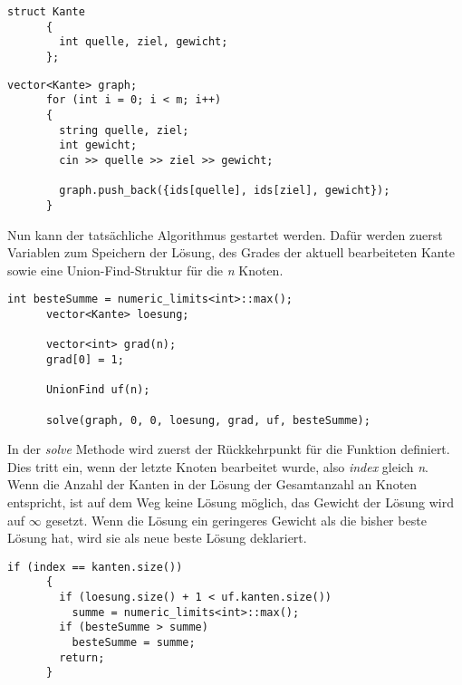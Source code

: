 \documentclass[12pt]{scrartcl}
\begin{document}
      \vspace{12pt}
      \begin{lstlisting}[style=c++]
      struct Kante
      {
        int quelle, ziel, gewicht;
      };
      \end{lstlisting}

      \vspace{12pt}
      \begin{lstlisting}[style=c++]
      vector<Kante> graph;
      for (int i = 0; i < m; i++)
      {
        string quelle, ziel;
        int gewicht;
        cin >> quelle >> ziel >> gewicht;

        graph.push_back({ids[quelle], ids[ziel], gewicht});
      }
      \end{lstlisting}

      \pagebreak

      \vspace{12pt}\noindent
      Nun kann der tats{\"a}chliche Algorithmus gestartet werden. Daf{\"u}r werden zuerst Variablen zum Speichern der L{\"o}sung, des Grades der aktuell bearbeiteten Kante sowie eine Union-Find-Struktur f{\"u}r die \textit{n} Knoten.

      \vspace{12pt}
      \begin{lstlisting}[style=c++]
      int besteSumme = numeric_limits<int>::max();
      vector<Kante> loesung;
      
      vector<int> grad(n);
      grad[0] = 1;
      
      UnionFind uf(n);
      
      solve(graph, 0, 0, loesung, grad, uf, besteSumme);
      \end{lstlisting}

      \vspace{12pt}\noindent
      In der \textit{solve} Methode wird zuerst der R{\"u}ckkehrpunkt f{\"u}r die Funktion definiert. Dies tritt ein, wenn der letzte Knoten bearbeitet wurde, also \textit{index} gleich \textit{n}. Wenn die Anzahl der Kanten in der L{\"o}sung der Gesamtanzahl an Knoten entspricht, ist auf dem Weg keine L{\"o}sung m{\"o}glich, das Gewicht der L{\"o}sung wird auf $\infty$ gesetzt. Wenn die L{\"o}sung ein geringeres Gewicht als die bisher beste L{\"o}sung hat, wird sie als neue beste L{\"o}sung deklariert.

      \vspace{12pt}
      \begin{lstlisting}[style=c++]
      if (index == kanten.size())
      {
        if (loesung.size() + 1 < uf.kanten.size())
          summe = numeric_limits<int>::max();
        if (besteSumme > summe)
          besteSumme = summe;
        return;
      }
      \end{lstlisting}
\end{document}

